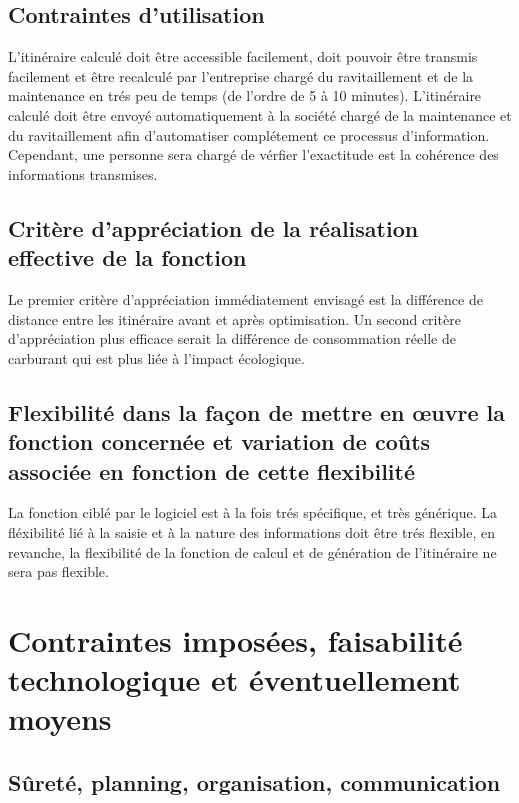     \subsection{Contraintes d'utilisation}
    
        L'itinéraire calculé doit être accessible facilement, doit pouvoir être transmis facilement et être recalculé par l'entreprise chargé du ravitaillement et de la maintenance en trés peu de temps (de l'ordre de 5 à 10 minutes).
        L'itinéraire calculé doit être envoyé automatiquement à la société chargé de la maintenance et du ravitaillement afin d'automatiser complétement ce processus d'information. Cependant, une personne sera chargé de vérfier l'exactitude est la cohérence des informations transmises.
    
    \subsection{Critère d'appréciation de la réalisation effective de la fonction}
    
        Le premier critère d'appréciation immédiatement envisagé est la différence de distance entre les itinéraire avant et après optimisation.
        Un second critère d'appréciation plus efficace serait la différence de consommation réelle de carburant qui est plus liée à l'impact écologique.
    
    \subsection{Flexibilité dans la façon de mettre en œuvre la fonction concernée et variation de coûts associée en fonction de cette flexibilité}

        La fonction ciblé par le logiciel est à la fois trés spécifique, et très générique.
        La fléxibilité lié à la saisie et à la nature des informations doit être trés flexible, en revanche, la flexibilité de la fonction de calcul et de génération de l'itinéraire ne sera pas flexible.

\section{Contraintes imposées, faisabilité technologique et éventuellement moyens}

    \subsection{Sûreté, planning, organisation, communication}
    

